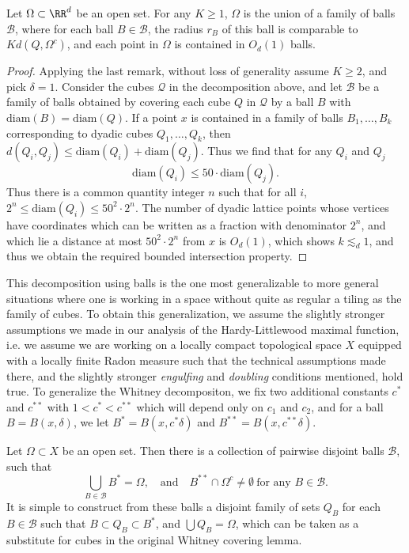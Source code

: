 \begin{theorem}
    Let $\Omega \subset \RR^d$ be an open set. For any $K \geq 1$, $\Omega$ is the union of a family of balls $\mathcal{B}$, where for each ball $B \in \mathcal{B}$, the radius $r_B$ of this ball is comparable to $K d(Q, \Omega^c)$, and each point in $\Omega$ is contained in $O_d(1)$ balls.
\end{theorem}
\begin{proof}
    Applying the last remark, without loss of generality assume $K \geq 2$, and pick $\delta = 1$. Consider the cubes $\mathcal{Q}$ in the decomposition above, and let $\mathcal{B}$ be a family of balls obtained by covering each cube $Q$ in $\mathcal{Q}$ by a ball $B$ with $\text{diam}(B) = \text{diam}(Q)$. If a point $x$ is contained in a family of balls $B_1,\dots,B_k$ corresponding to dyadic cubes $Q_1,\dots,Q_k$, then $d(Q_i,Q_j) \leq \text{diam}(Q_i) + \text{diam}(Q_j)$. Thus we find that for any $Q_i$ and $Q_j$
    \[ \text{diam}(Q_i) \leq 50 \cdot \text{diam}(Q_j). \]
    Thus there is a common quantity integer $n$ such that for all $i$, $2^n \leq \text{diam}(Q_i) \leq 50^2 \cdot 2^n$. The number of dyadic lattice points whose vertices have coordinates which can be written as a fraction with denominator $2^n$, and which lie a distance at most $50^2 \cdot 2^n$ from $x$ is $O_d(1)$, which shows $k \lesssim_d 1$, and thus we obtain the required bounded intersection property.
\end{proof}

This decomposition using balls is the one most generalizable to more general situations where one is working in a space without quite as regular a tiling as the family of cubes. To obtain this generalization, we assume the slightly stronger assumptions we made in our analysis of the Hardy-Littlewood maximal function, i.e. we assume we are working on a locally compact topological space $X$ equipped with a locally finite Radon measure such that the technical assumptions made there, and the slightly stronger \emph{engulfing} and \emph{doubling} conditions mentioned, hold true. To generalize the Whitney decompositon, we fix two additional constants $c^*$ and $c^{**}$ with $1 < c^* < c^{**}$ which will depend only on $c_1$ and $c_2$, and for a ball $B = B(x,\delta)$, we let $B^* = B(x, c^* \delta)$ and $B^{**} = B(x, c^{**} \delta)$.

\begin{theorem}
    Let $\Omega \subset X$ be an open set. Then there is a collection of pairwise disjoint balls $\mathcal{B}$, such that
    \[ \bigcup_{B \in \mathcal{B}} B^* = \Omega, \quad\text{and}\quad B^{**} \cap \Omega^c \neq \emptyset\ \text{for any $B \in \mathcal{B}$}. \]
    It is simple to construct from these balls a disjoint family of sets $Q_B$ for each $B \in \mathcal{B}$ such that $B \subset Q_B \subset B^*$, and $\bigcup Q_B = \Omega$, which can be taken as a substitute for cubes in the original Whitney covering lemma.
\end{theorem}


